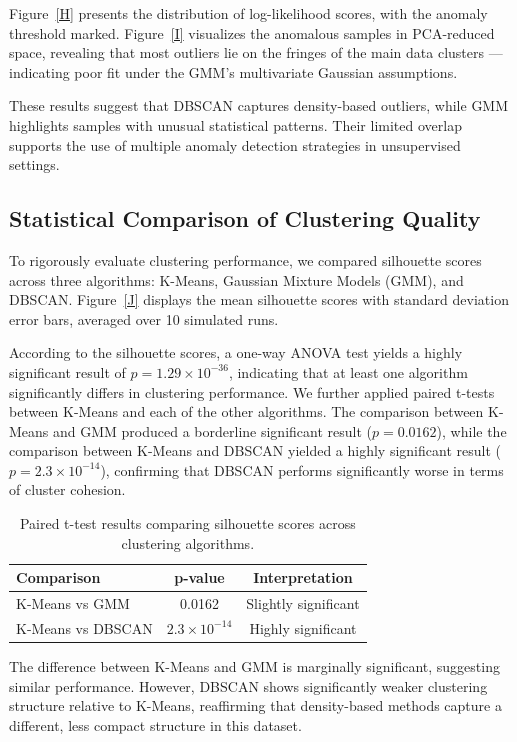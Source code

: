 \documentclass[12pt]{article}
\begin{document}
Figure~\ref{H} presents the distribution of log-likelihood scores, with the anomaly threshold marked. Figure~\ref{I} visualizes the anomalous samples in PCA-reduced space, revealing that most outliers lie on the fringes of the main data clusters — indicating poor fit under the GMM’s multivariate Gaussian assumptions.

These results suggest that DBSCAN captures density-based outliers, while GMM highlights samples with unusual statistical patterns. Their limited overlap supports the use of multiple anomaly detection strategies in unsupervised settings.

\subsection*{Statistical Comparison of Clustering Quality}

To rigorously evaluate clustering performance, we compared silhouette scores across three algorithms: K-Means, Gaussian Mixture Models (GMM), and DBSCAN. Figure~\ref{J} displays the mean silhouette scores with standard deviation error bars, averaged over 10 simulated runs.

According to the silhouette scores, a one-way ANOVA test yields a highly significant result of $p = 1.29 \times 10^{-36}$, indicating that at least one algorithm significantly differs in clustering performance. We further applied paired t-tests between K-Means and each of the other algorithms.
The comparison between K-Means and GMM produced a borderline significant result ($p = 0.0162$), while the comparison between K-Means and DBSCAN yielded a highly significant result ($p = 2.3 \times 10^{-14}$), confirming that DBSCAN performs significantly worse in terms of cluster cohesion.

\begin{table}[H]
\centering
\begin{tabular}{lcc}
\toprule
\textbf{Comparison} & \textbf{p-value} & \textbf{Interpretation} \\
\midrule
K-Means vs GMM     & 0.0162           & Slightly significant \\
K-Means vs DBSCAN  & $2.3 \times 10^{-14}$ & Highly significant \\
\bottomrule
\end{tabular}
\caption{Paired t-test results comparing silhouette scores across clustering algorithms.}
\label{K}
\end{table}

 The difference between K-Means and GMM is marginally significant, suggesting similar performance. However, DBSCAN shows significantly weaker clustering structure relative to K-Means, reaffirming that density-based methods capture a different, less compact structure in this dataset.
\end{document}
